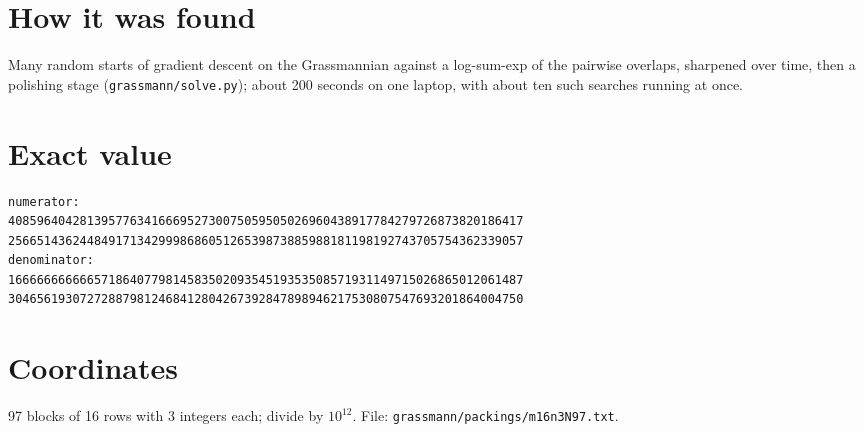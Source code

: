 \documentclass[11pt,a4paper]{article}
\begin{document}
\section{How it was found}
Many random starts of gradient descent on the Grassmannian against a log-sum-exp of the pairwise overlaps, sharpened over time, then a polishing stage (\texttt{grassmann/solve.py}); about 200 seconds on one laptop, with about ten such searches running at once.


\appendix
\section{Exact value}
{\small
\begin{verbatim}
numerator:
408596404281395776341666952730075059505026960438917784279726873820186417
256651436244849171342999868605126539873885988181198192743705754362339057
denominator:
166666666666571864077981458350209354519353508571931149715026865012061487
304656193072728879812468412804267392847898946217530807547693201864004750
\end{verbatim}}

\section{Coordinates}
97 blocks of 16 rows with 3 integers each; divide by $10^{12}$. File: \texttt{grassmann/packings/m16n3N97.txt}.
{\tiny
\begin{multicols}{3}
\end{multicols}}
\end{document}
